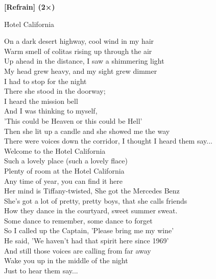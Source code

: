 \documentclass{novel}
\begin{document}
{{\begin{minipage}[t][0.4\textheight][t]{\textwidth}
\begin{multicols}{2}
\textbf{[Refrain] (2×)}

\end{multicols}
\end{minipage}

\nointerlineskip
\begin{minipage}[b][0.55\textheight][t]{\textwidth}
\vspace{0.1\textheight}
\h*{Hotel California}

\begin{multicols}{2}
On a dark desert highway, cool wind in my hair\\
Warm smell of colitas rising up through the air\\
Up ahead in the distance, I saw a shimmering light\\
My head grew heavy, and my sight grew dimmer\\
I had to stop for the night\\
There she stood in the doorway;\\
I heard the mission bell\\
And I was thinking to myself,\\
'This could be Heaven or this could be Hell'\\
Then she lit up a candle and she showed me the way\\
There were voices down the corridor, I thought I heard them say...\\

Welcome to the Hotel California\\
Such a lovely place (such a lovely flace)\\
Plenty of room at the Hotel California\\
Any time of year, you can find it here\\

Her mind is Tiffany-twisted, She got the Mercedes Benz\\
She's got a lot of pretty, pretty boys, that she calls friends\\
How they dance in the courtyard, sweet summer sweat.\\
Some dance to remember, some dance to forget\\
So I called up the Captain, 'Please bring me my wine'\\
He said, 'We haven't had that spirit here since 1969'\\
And still those voices are calling from far away\\
Wake you up in the middle of the night\\
Just to hear them say...\\


\end{multicols}
\end{minipage}}}
\end{document}
